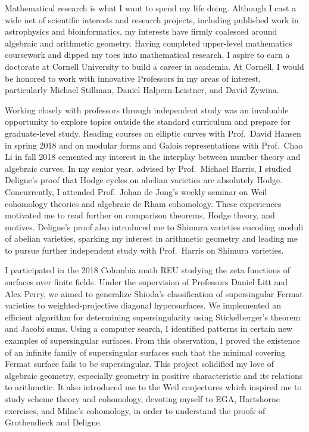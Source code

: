 \documentclass[11pt]{article}
\begin{document}
Mathematical research is what I want to spend my life doing. Although I cast a wide net of scientific interests and research projects, including published work in astrophysics and bioinformatics, my interests have firmly coalesced around algebraic and arithmetic geometry. Having completed upper-level mathematics coursework and dipped my toes into mathematical research, I aspire to earn a doctorate at Cornell University to build a career in academia. At Cornell, I would be honored to work with innovative Professors in my areas of interest, particularly Michael Stillman, Daniel Halpern-Leistner, and David Zywina.
\par
Working closely with professors through independent study was an invaluable opportunity to explore topics outside the standard curriculum and prepare for graduate-level study. Reading courses on elliptic curves with Prof.\ David Hansen in spring 2018 and on modular forms and Galois representations with Prof.\ Chao Li in fall 2018 cemented my interest in the interplay between number theory and algebraic curves. In my senior year, advised by Prof.\ Michael Harris, I studied Deligne's proof that Hodge cycles on abelian varieties are absolutely Hodge. Concurrently, I attended Prof.\ Johan de Jong's weekly seminar on Weil cohomology theories and algebraic de Rham cohomology. These experiences motivated me to read further on comparison theorems, Hodge theory, and motives. Deligne's proof also introduced me to Shimura varieties encoding moduli of abelian varieties, sparking my interest in arithmetic geometry and leading me to pursue further independent study with Prof.\ Harris on Shimura varieties.
\par
I participated in the 2018 Columbia math REU studying the zeta functions of surfaces over finite fields. Under the supervision of Professors Daniel Litt and Alex Perry, we aimed to generalize Shioda’s classification of supersingular Fermat varieties  to weighted-projective diagonal hypersurfaces. We implemented an efficient algorithm for determining supersingularity using Stickelberger's theorem and Jacobi sums. Using a computer search, I identified patterns in certain new examples of supersingular surfaces. From this observation, I proved the existence of an infinite family of supersingular surfaces such that the minimal covering Fermat surface fails to be supersingular. This project solidified my love of algebraic geometry, especially geometry in positive characteristic and its relations to arithmetic. It also introduced me to the Weil conjectures which inspired me to study scheme theory and \etale cohomology, devoting myself to EGA, Hartshorne exercises, and Milne's \etale cohomology, in order to understand the proofs of Grothendieck and Deligne. 
\end{document}
